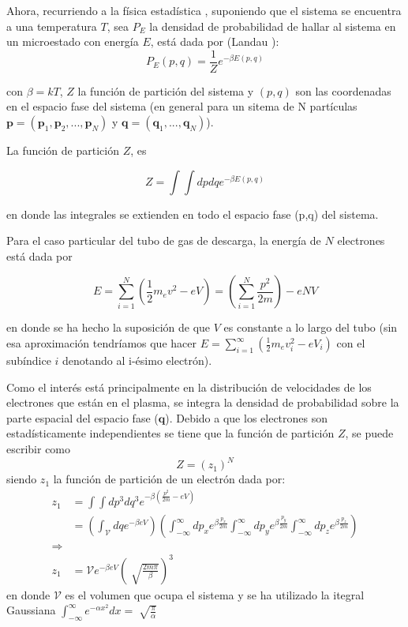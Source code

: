 \documentclass[letterpaper,12pt]{article}
\begin{document}
Ahora, recurriendo a  la física estadística , suponiendo que el sistema se encuentra a una temperatura $T$, sea $P_E$ la densidad de  probabilidad de hallar al sistema en un  microestado con energía $E$, está dada por (Landau \cite{landau}): 
$$ P_E(p,q)= \frac{1}{Z}e^{-\beta E(p,q)}$$

con  $\beta=kT$, $Z$ la función de partición del sistema y $(p,q)$ son las coordenadas en el espacio fase del sistema (en general para un  sitema de N partículas $\mathbf{p} = (\mathbf{p}_1,\mathbf{p}_2,...,\mathbf{p}_N) $ y $ \mathbf{q}=(\mathbf{q}_1,...,\mathbf{q}_N)$).

La función de partición $Z$, es 

$$ Z=\int\int dpdq e^{-\beta E(p,q)}$$

en donde las integrales se extienden en todo el espacio fase (p,q) del sistema.

Para el caso particular del tubo de gas de descarga, la energía de $N$ electrones está dada por

$$E=\sum_{i=1}^N(\frac{1}{2}m_ev^2-eV)=(\sum_{i=1}^N\frac{p^2}{2m})-eNV$$

en donde se ha hecho la suposición  de que $V$ es constante a lo largo del tubo (sin esa aproximación tendríamos que hacer $E=\sum_{i=1}^{\infty}(\frac{1}{2}m_ev_i^2-eV_i)$ con el subíndice $i$ denotando al i-ésimo electrón).

Como el interés está principalmente  en la distribución de velocidades de los electrones que están en el plasma, se integra la densidad de probabilidad  sobre la parte espacial del espacio fase ($\mathbf{q}$).
Debido a que los electrones son estadísticamente independientes se tiene que la función de partición $Z$, se puede escribir como 
$$  Z=(z_1)^N$$
siendo $z_1$ la función de partición de un electrón dada por:
\begin{equation*}
\begin{split}
z_1&=\int\int dp^3dq^3e^{-\beta(\frac{p^2}{2m}-eV)}\\
&=\left( \int_{\mathcal{V}} dq e^{-\beta eV}\right) \left( \int_{-\infty}^{\infty} dp_x e^{\beta \frac{p_x}{2m}}\int_{-\infty}^{\infty} dp_y e^{\beta \frac{p_y}{2m}}\int_{-\infty}^{\infty} dp_z e^{\beta \frac{p_z}{2m}} \right)\\
\Rightarrow \\
z_1&= \mathcal{V} e^{-\beta eV} \left(\sqrt[]{\frac{2m\pi}{\beta}}\right) ^3
\end{split}
\end{equation*}
en donde $\mathcal{V}$ es el volumen que ocupa el sistema y se ha utilizado la itegral Gaussiana $\int_{-\infty}^{\infty}e^{-\alpha x^2}dx=\sqrt[]{\frac{\pi}{\alpha}}$
\end{document}
